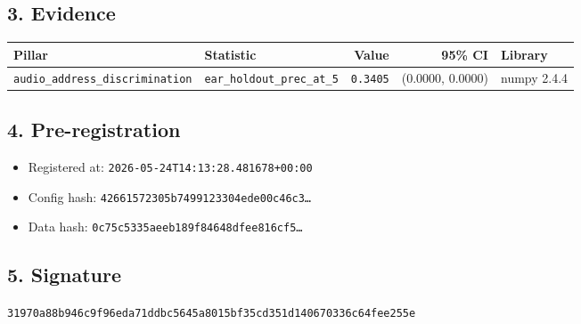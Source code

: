 \documentclass{article}
\begin{document}
\subsection*{3. Evidence}
\begin{tabular}{llrrl}\toprule
\textbf{Pillar} & \textbf{Statistic} & \textbf{Value} & \textbf{95\% CI} & \textbf{Library} \\\midrule
\texttt{audio\_address\_discrimination} & \texttt{ear\_holdout\_prec\_at\_5} & \texttt{0.3405} & (0.0000, 0.0000) & numpy 2.4.4 \\
\bottomrule\end{tabular}
\subsection*{4. Pre-registration}
\begin{itemize}
\item Registered at: \texttt{2026-05-24T14:13:28.481678+00:00}
\item Config hash: \texttt{42661572305b7499123304ede00c46c3\dots}
\item Data hash: \texttt{0c75c5335aeeb189f84648dfee816cf5\dots}
\end{itemize}
\subsection*{5. Signature}
\texttt{31970a88b946c9f96eda71ddbc5645a8015bf35cd351d140670336c64fee255e}\\
\end{document}
